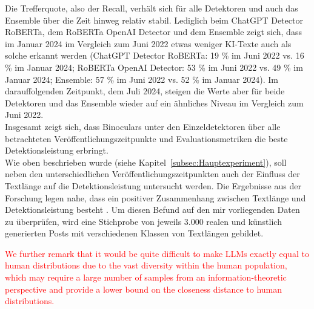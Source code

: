 Die Trefferquote, also der Recall, verhält sich für alle Detektoren und auch das Ensemble über die Zeit hinweg relativ stabil. Lediglich beim ChatGPT Detector RoBERTa, dem RoBERTa OpenAI Detector und dem Ensemble zeigt sich, dass im Januar 2024 im Vergleich zum Juni 2022 etwas weniger KI-Texte auch als solche erkannt werden (ChatGPT Detector RoBERTa: 19 \% im Juni 2022 vs. 16 \% im Januar 2024; RoBERTa OpenAI Detector: 53 \% im Juni 2022 vs. 49 \% im Januar 2024; Ensemble: 57 \% im Juni 2022 vs. 52 \% im Januar 2024). Im darauffolgenden Zeitpunkt, dem Juli 2024, steigen die Werte aber für beide Detektoren und das Ensemble wieder auf ein ähnliches Niveau im Vergleich zum Juni 2022. \\
Insgesamt zeigt sich, dass Binoculars unter den Einzeldetektoren über alle betrachteten Veröffentlichungszeitpunkte und Evaluationsmetriken die beste Detektionsleistung erbringt. \\
Wie oben beschrieben wurde (siehe Kapitel~\ref{subsec:Hauptexperiment}), soll neben den unterschiedlichen Veröffentlichungszeitpunkten auch der Einfluss der Textlänge auf die Detektionsleistung untersucht werden. Die Ergebnisse aus der Forschung legen nahe, dass ein positiver Zusammenhang zwischen Textlänge und Detektionsleistung besteht \autocite{chakraborty2023possibilitiesaigeneratedtextdetection,Rashidi_Fennell_Albahra_Hu_Gorbett_2023}. Um diesen Befund auf den mir vorliegenden Daten zu überprüfen, wird eine Stichprobe von jeweils 3.000 realen und künstlich generierten Posts mit verschiedenen Klassen von Textlängen gebildet.

\textcolor{red}{We further remark that it would be quite difficult to make LLMs exactly equal to human distributions due to the vast diversity within the human population, which may require a large number of samples from an information-theoretic perspective and provide a lower bound on the closeness distance to human distributions. \autocite{chakraborty2023possibilitiesaigeneratedtextdetection}}

